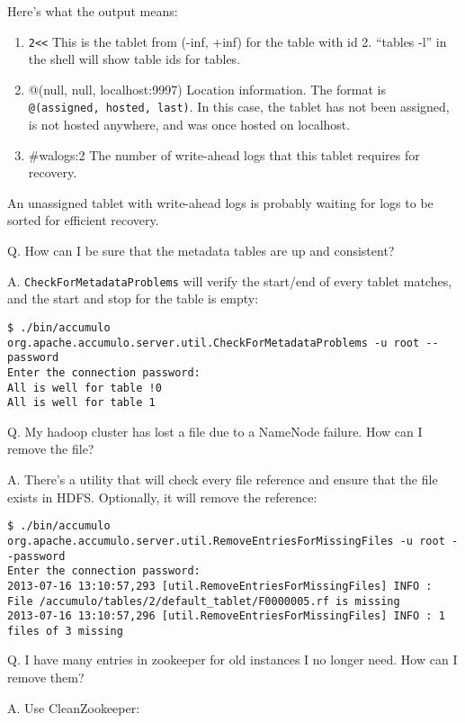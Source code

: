Here's what the output means:

\begin{enumerate}
\item{\texttt{2<<} This is the tablet from (-inf, +inf) for the
  table with id 2.  ``tables -l'' in the shell will show table ids for
  tables.}
\item{@(null, null, localhost:9997)} Location information.  The
  format is \texttt{@(assigned, hosted, last)}.  In this case, the
  tablet has not been assigned, is not hosted anywhere, and was once
  hosted on localhost.
\item{\#walogs:2} The number of write-ahead logs that this tablet requires for recovery.
\end{enumerate}

An unassigned tablet with write-ahead logs is probably waiting for
logs to be sorted for efficient recovery.

Q. How can I be sure that the metadata tables are up and consistent?

A. \texttt{CheckForMetadataProblems} will verify the start/end of
every tablet matches, and the start and stop for the table is empty:

\small
\begin{verbatim}
$ ./bin/accumulo org.apache.accumulo.server.util.CheckForMetadataProblems -u root --password
Enter the connection password: 
All is well for table !0
All is well for table 1
\end{verbatim}
\normalsize

Q. My hadoop cluster has lost a file due to a NameNode failure.  How can I remove the file?

A. There's a utility that will check every file reference and ensure
that the file exists in HDFS.  Optionally, it will remove the
reference:

\small
\begin{verbatim}
$ ./bin/accumulo org.apache.accumulo.server.util.RemoveEntriesForMissingFiles -u root --password
Enter the connection password: 
2013-07-16 13:10:57,293 [util.RemoveEntriesForMissingFiles] INFO : File /accumulo/tables/2/default_tablet/F0000005.rf is missing
2013-07-16 13:10:57,296 [util.RemoveEntriesForMissingFiles] INFO : 1 files of 3 missing
\end{verbatim}
\normalsize

Q. I have many entries in zookeeper for old instances I no longer need.  How can I remove them?

A. Use CleanZookeeper:

